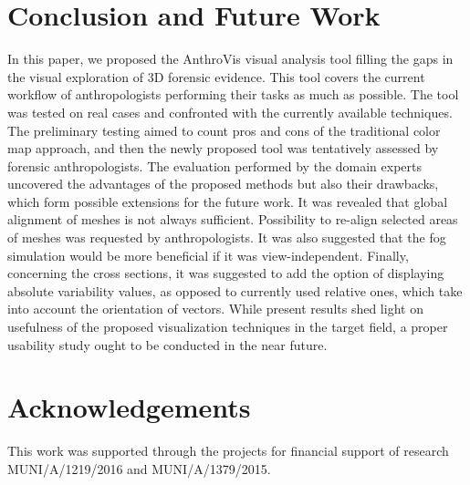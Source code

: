 \documentclass[final,5p,times]{elsarticle}
\begin{document}
\section{Conclusion and Future Work} \label{conclusion}
In this paper, we proposed the AnthroVis visual analysis tool filling the gaps in the visual exploration of 3D forensic evidence.
This tool covers the current workflow of anthropologists performing their tasks as much as possible.
The tool was tested on real cases and confronted with the currently available techniques. 
The preliminary testing aimed to count pros and cons of the traditional color map approach, and then the newly proposed tool was tentatively assessed by forensic anthropologists. 
The evaluation performed by the domain experts uncovered the advantages of the proposed methods but also their drawbacks, which form possible extensions for the future work. 
It was revealed that global alignment of meshes is not always sufficient.
Possibility to re-align selected areas of meshes was requested by anthropologists.
It was also suggested that the fog simulation would be more beneficial if it was view-independent. 
Finally, concerning the cross sections, it was suggested to add the option of displaying absolute variability values, as opposed to currently used relative ones, which take into account the orientation of vectors.
While present results shed light on usefulness of the proposed visualization techniques in the target field, a proper usability study ought to be conducted in the near future. 

\section{Acknowledgements}
\label{ackno}
\begin{sloppypar}
This work was supported through the projects for financial support of research MUNI/A/1219/2016 and MUNI/A/1379/2015.
\end{sloppypar}




\end{document}
